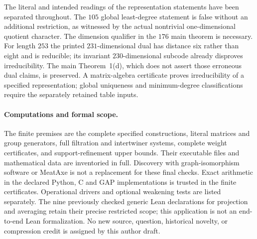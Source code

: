 The literal and intended readings of the representation statements have
been separated throughout. The $105$ global least-degree statement is
false without an additional restriction, as witnessed by the actual
nontrivial one-dimensional quotient character. The dimension qualifier
in the $176$ main theorem is necessary. For length $253$ the printed
$231$-dimensional dual has distance six rather than eight and is reducible;
its invariant $230$-dimensional subcode already disproves irreducibility.
The main Theorem~1(d), which does not assert those erroneous dual claims,
is preserved. A matrix-algebra certificate proves irreducibility of a
specified representation; global uniqueness and minimum-degree
classifications require the separately retained table inputs.

\paragraph{Computations and formal scope.}
The finite premises are the complete specified constructions, literal
matrices and group generators, full filtration and intertwiner systems,
complete weight certificates, and support-refinement upper bounds.
Their executable files and mathematical data are inventoried in full.
Discovery with graph-isomorphism software or MeatAxe is not a replacement
for these final checks. Exact arithmetic in the declared Python, C and
GAP implementations is trusted in the finite certificates. Operational
drivers and optional weakening tests are listed separately. The nine
previously checked generic Lean declarations for projection and averaging
retain their precise restricted scope; this application is not an
end-to-end Lean formalization. No new source, question, historical novelty,
or compression credit is assigned by this author draft.
